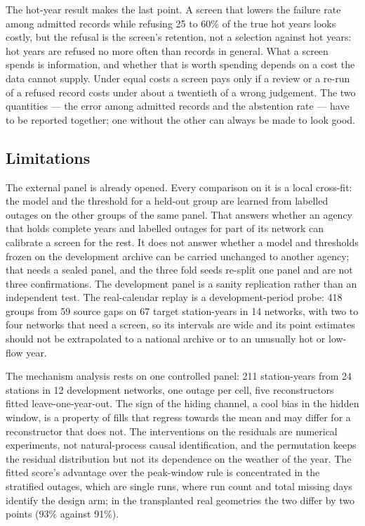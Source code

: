 \documentclass[draft]{agujournal2025}
\begin{document}
The hot-year result makes the last point. A screen that lowers the failure rate
among admitted records while refusing 25 to 60\% of the true hot years looks
costly, but the refusal is the screen's retention, not a selection against hot
years: hot years are refused no more often than records in general. What a screen
spends is information, and whether that is worth spending depends on a cost the
data cannot supply. Under equal costs a screen pays only if a review or a re-run
of a refused record costs under about a twentieth of a wrong judgement. The two
quantities --- the error among admitted records and the abstention rate --- have
to be reported together; one without the other can always be made to look good.

\subsection{Limitations}

The external panel is already opened. Every comparison on it is a local
cross-fit: the model and the threshold for a held-out group are learned from
labelled outages on the other groups of the same panel. That answers whether an
agency that holds complete years and labelled outages for part of its network can
calibrate a screen for the rest. It does not answer whether a model and thresholds
frozen on the development archive can be carried unchanged to another agency; that
needs a sealed panel, and the three fold seeds re-split one panel and are not
three confirmations. The development panel is a sanity replication rather than an
independent test. The real-calendar replay is a development-period probe: 418
groups from 59 source gaps on 67 target station-years in 14 networks, with two to
four networks that need a screen, so its intervals are wide and its point
estimates should not be extrapolated to a national archive or to an unusually
hot or low-flow year.

The mechanism analysis rests on one controlled panel: 211 station-years from 24
stations in 12 development networks, one outage per cell, five reconstructors fitted
leave-one-year-out. The sign of the hiding channel, a cool bias in the hidden
window, is a property of fills that regress towards the mean and may differ for a
reconstructor that does not. The interventions on the residuals are numerical
experiments, not natural-process causal identification, and the permutation keeps
the residual distribution but not its dependence on the weather of the year.
The fitted score's advantage over the peak-window rule is concentrated in the
stratified outages, which are single runs, where run count and total missing days
identify the design arm; in the transplanted real geometries the two differ by two
points (93\% against 91\%).
\end{document}
